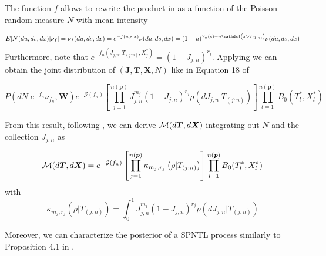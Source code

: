 The function $f$ allows to rewrite the product in  as a function of the Poisson random measure $N$  with mean intensity

\begin{equation*}
E[N(du, ds, dx)|\nu_f] = \nu_f(du, ds,dx) = e^{-f(u,s,x)}\nu(du,ds,dx) = (1 - u) ^ {Y_n(s) - n\indicator\left(s > T_{(1:n)}\right)} \nu(du,ds,dx)
\end{equation*}
Furthermore, note that $e^{-f_n(J_{j,n},T_{(j:n)},X_j^*)} = (1 - J_{j,n}) ^ {r_j}$. Applying  we can obtain the joint distribution of $(\boldsymbol{J}, \boldsymbol{T}, \boldsymbol{X}, N)$ like in Equation 18 of \cite{james2006poisson}

\begin{equation}
P(dN|e^{-f_n}\nu_{f_n}, \boldsymbol{W})e^{-\mathcal{G}(f_n)}\left[\prod_{j=1}^{n(\boldsymbol{p})} J_{j,n}^{m_j}(1- J_{j,n})^{r_j} \rho(dJ_{j,n}|T_{(j:n)})\right]\prod_{l=1}^{n(\boldsymbol{p})}B_0(T_l^*, X_l^*)
\end{equation}

From this result, following \cite{james2006poisson}, we can derive $\mathcal{M}(d\boldsymbol{T}, d\boldsymbol{X})$ integrating out $N$ and the collection $J_{j,n}$ as

\begin{equation*}
\mathcal{M}(d\boldsymbol{T}, d\boldsymbol{X}) = e^{-\mathcal{G}(f_n)}\left[\prod_{j=1}^{n(\boldsymbol{p})} \kappa_{m_j, r_j}\left(\rho| T_{(j:n)}\right)\right]\prod_{l=1}^{n(\boldsymbol{p})}B_0(T_l^*, X_l^*)
\end{equation*}
with 
\begin{equation*}
\kappa_{m_j, r_j}\left(\rho |T_{(j:n)}\right)=\int_0^1 J_{j,n}^{m_j}\left(1- J_{j,n}\right)^{r_j} \rho\left(dJ_{j,n}|T_{(j:n)}\right)
\end{equation*}

Moreover, we can characterize the posterior of a SPNTL process similarly to Proposition 4.1 in \cite{james2006poisson}.

